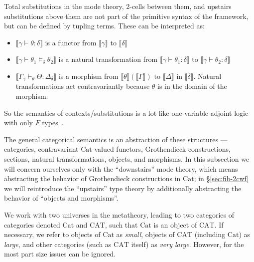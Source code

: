 \documentclass[10pt]{article}
\theoremstyle{definition}
\newcommand{\yields}{\vdash}
\newcommand\mm[1]{\llbracket #1 \rrbracket}
\newcommand\Cat{\mathrm{Cat}}
\newcommand\CAT{\mathrm{CAT}}
\begin{document}
Total substitutions in the mode theory, 2-cells between them, and
upstairs substitutions above them are not part of the primitive syntax
of the framework, but can be defined by tupling terms.
These can be interpreted as: 
\begin{itemize}
\item $\mm{\gamma \yields \theta : \delta}$ is a functor from $\mm{\gamma}$ to $\mm{\delta}$
\item $\mm{\gamma \yields \theta_1 \vDash_\delta \theta_2}$ is a natural
  transformation from $\mm{\gamma \yields \theta_1 : \delta}$ to
  $\mm{\gamma \yields \theta_2 : \delta}$
\item $\mm{\Gamma_{\gamma} \yields_\theta \Theta : \Delta_\delta}$ is a
  morphism from $\mm{\theta}(\mm{\Gamma})$ to $\mm{\Delta}$ in
  $\mm{\delta}$.
  Natural transformations act contravariantly because $\theta$ is in the
  domain of the morphism.  
  \end{itemize}
So the semantics of contexts/substitutions is a lot like 
one-variable adjoint logic with only $F$ types~\cite{ls15adjoint}.  

The general categorical semantics is an abstraction of these structures --- categories, contravariant $\Cat$-valued functors, Grothendieck constructions, sections, natural transformations, objects, and morphisms.
In this subsection we will concern ourselves only with the ``downstairs'' mode theory, which means abstracting the behavior of Grothendieck constructions in $\Cat$; in \S\ref{sec:fib-2cwf} we will reintroduce the ``upstairs'' type theory by additionally abstracting the behavior of ``objects and morphisms''.

We work with two universes in the metatheory, leading to two categories of categories denoted $\Cat$ and $\CAT$, such that $\Cat$ is an object of $\CAT$.
If necessary, we refer to objects of $\Cat$ as \emph{small}, objects of $\CAT$ (including $\Cat$) as \emph{large}, and other categories (such as $\CAT$ itself) as \emph{very large}.
However, for the most part size issues can be ignored.
\end{document}
